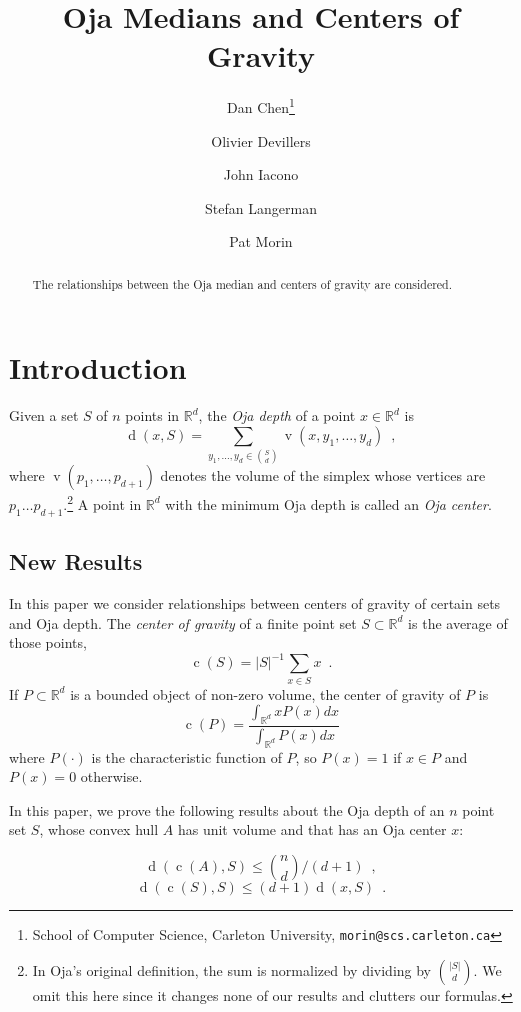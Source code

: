 \documentclass{cccg10}
\title{Oja Medians and Centers of Gravity}
\author{Dan Chen\thanks{School of Computer Science,
        Carleton University, \texttt{morin@scs.carleton.ca}}
        \and
        Olivier Devillers
        \and
        John Iacono
        \and
        Stefan Langerman
        \and
        Pat Morin\footnotemark[1]}
\DeclareMathOperator{\od}{d}
\DeclareMathOperator{\vol}{v}
\DeclareMathOperator{\cog}{c}
\newcommand{\R}{\mathbb{R}}
\newcommand{\eqlabel}[1]{\label{eq:#1}}
\begin{document}
\thispagestyle{empty}
\maketitle


\begin{abstract}
The relationships between the Oja median and centers of gravity are
considered.
\end{abstract}

\section{Introduction}

Given a set $S$ of $n$ points in $\mathbb{R}^{d}$, the \emph{Oja depth}
\cite{Oja83} of a point $x\in\R^d$ is
\[ 
   \od(x, S) 
      = \sum_{y_{1},\ldots , y_{d} \in \binom{S}{d}} 
         \vol(x, y_{1}, \ldots, y_{d}) \enspace ,
\]
where $\vol(p_{1},\ldots, p_{d+1})$ denotes the volume of the simplex
whose vertices are $p_{1}\ldots p_{d+1}$.\footnote{In Oja's original
definition, the sum is normalized by dividing by $\binom{|S|}{d}$. We omit this here since it changes none of our results and clutters our formulas.}
A point in $\mathbb{R}^{d}$ with the minimum Oja depth is called an
\emph{Oja center}.

\subsection{New Results}

In this paper we consider relationships between centers of gravity of
certain sets and Oja depth. The \emph{center of gravity} of a finite
point set $S\subset\R^d$ is the average of those points,
\[
  \cog(S) = |S|^{-1}\sum_{x\in S} x \enspace .
\]
If $P\subset\R^d$ is a bounded object of non-zero volume, the center of gravity of $P$ is
\[
  \cog(P) = \frac{\int_{\R^d} x P(x) dx}{\int_{\R^d} P(x) dx}
\]
where $P(\cdot)$ is the characteristic function of $P$, so $P(x)=1$ if $x\in P$ and $P(x)=0$ otherwise.

In this paper, we prove the following results about the Oja depth of an
$n$ point set $S$, whose convex hull $A$ has unit volume and that has an Oja center $x$:

\begin{equation}
  \od(\cog(A),S) \le \binom{n}{d}/(d+1) \enspace ,
   \eqlabel{centerpoint}
\end{equation}
\begin{equation}
  \od(\cog(S),S) \le (d+1)\od(x,S) \enspace .
   \eqlabel{approx}
\end{equation}
\end{document}
